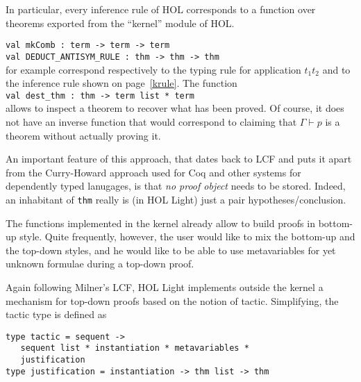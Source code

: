 \documentclass[preprint]{sigplanconf}
\begin{document}
In particular, every inference rule of HOL corresponds to a function over theorems exported from the ``kernel'' module of HOL.

\verb+val mkComb : term -> term -> term+\\
\indent
\verb+val DEDUCT_ANTISYM_RULE : thm -> thm -> thm+\\
for example correspond respectively to the typing rule for application $t_1 t_2$ and to the inference rule shown on page~\ref{krule}. The function\\
\indent
\verb+val dest_thm : thm -> term list * term+\\
allows to inspect a theorem to recover what has been proved. Of course, it does not have an inverse function that would correspond to claiming that $\Gamma \vdash p$ is a theorem without actually proving it.

An important feature of this approach, that dates back to LCF and puts it apart from the Curry-Howard approach used for Coq and other systems for dependently typed lanugages, is that \emph{no proof object} needs to be stored. Indeed, an inhabitant of \verb+thm+ really is (in HOL Light) just a pair hypotheses/conclusion.

The functions implemented in the kernel already allow to build proofs in bottom-up style. Quite frequently, however, the user would like to mix the bottom-up and the top-down styles, and he would like to be able to use metavariables for yet unknown formulae during a top-down proof.

Again following Milner's LCF, HOL Light implements outside the kernel a mechanism for top-down proofs based on the notion of tactic. Simplifying, the tactic type is defined as
{\small
\begin{verbatim}
type tactic = sequent ->
   sequent list * instantiation * metavariables *
   justification
type justification = instantiation -> thm list -> thm
\end{verbatim}
}
\end{document}
